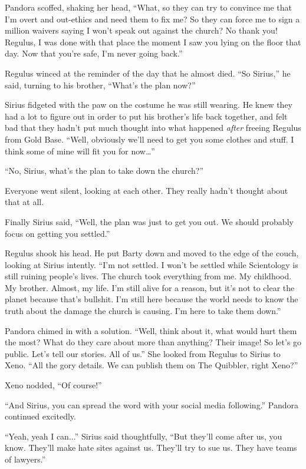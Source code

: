 \documentclass[12pt,twoside,openright]{memoir}
\begin{document}
Pandora scoffed, shaking her head, ``What, so they can try to convince me that I'm overt and out-ethics and need them to fix me? So they can force me to sign a million waivers saying I won't speak out against the church? No thank you! Regulus, I was done with that place the moment I saw you lying on the floor that day. Now that you're safe, I'm never going back.''

Regulus winced at the reminder of the day that he almost died. ``So Sirius,'' he said, turning to his brother, ``What's the plan now?''

Sirius fidgeted with the paw on the costume he was still wearing. He knew they had a lot to figure out in order to put his brother's life back together, and felt bad that they hadn't put much thought into what happened
\textit{after} freeing Regulus from Gold Base. ``Well, obviously we'll need to get you some clothes and stuff. I think some of mine will fit you for now…''

``No, Sirius, what's the plan to take down the church?''

Everyone went silent, looking at each other. They really hadn't thought about that at all.

Finally Sirius said, ``Well, the plan was just to get you out. We should probably focus on getting you settled.'' 

Regulus shook his head. He put Barty down and moved to the edge of the couch, looking at Sirius intently. ``I'm not settled. I won't be settled while Scientology is still ruining people's lives. The church took everything from me. My childhood. My brother. Almost, my life. I'm still alive for a reason, but it's not to clear the planet because that's bullshit. I'm still here because the world needs to know the truth about the damage the church is causing. I'm here to take them down.''

Pandora chimed in with a solution. ``Well, think about it, what would hurt them the most? What do they care about more than anything? Their image! So let's go public. Let's tell our stories. All of us.'' She looked from Regulus to Sirius to Xeno. ``All the gory details. We can publish them on The Quibbler, right Xeno?''

Xeno nodded, ``Of course!''

``And Sirius, you can spread the word with your social media following.'' Pandora continued excitedly.

``Yeah, yeah I can...'' Sirius said thoughtfully, ``But they'll come after us, you know. They'll make hate sites against us. They'll try to sue us. They have teams of lawyers.''
\end{document}
